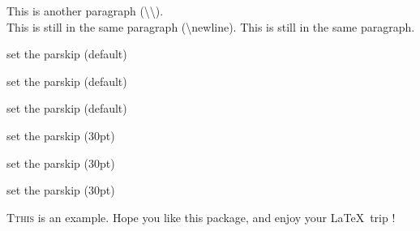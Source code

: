 \documentclass{ctexart}
\begin{document}
            This is another paragraph (\textbackslash \textbackslash).\\ %
            This is still in the same paragraph (\textbackslash newline).\newline %
            This is still in the same paragraph.
            
            \setlength{\parskip}{0pt plus 1pt} %

            set the parskip (default)

            set the parskip (default)

            set the parskip (default)

            {\setlength{\parskip}{30pt}
            
            set the parskip (30pt)

            set the parskip (30pt)

            set the parskip (30pt)
            }

            \lettrine{T}{this} is an example. Hope you like this package, and enjoy your \LaTeX\ trip !
            
\end{document}
